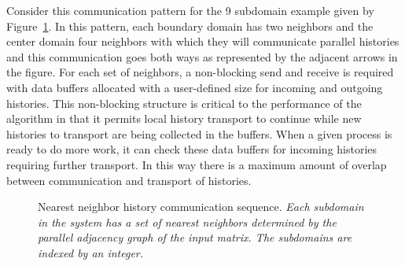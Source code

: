 \documentclass{snamc2013}
\begin{document}
Consider this communication pattern for the 9 subdomain example given
by Figure~\ref{fig:nearest_neighbor_comm}. In this pattern, each
boundary domain has two neighbors and the center domain four neighbors
with which they will communicate parallel histories and this
communication goes both ways as represented by the adjacent arrows in
the figure. For each set of neighbors, a non-blocking send and receive
is required with data buffers allocated with a user-defined size for
incoming and outgoing histories. This non-blocking structure is
critical to the performance of the algorithm in that it permits local
history transport to continue while new histories to transport are
being collected in the buffers. When a given process is ready to do
more work, it can check these data buffers for incoming histories
requiring further transport. In this way there is a maximum amount of
overlap between communication and transport of histories.

\begin{figure}[h!]
  \begin{center}
    \scalebox{0.7}{  }
  \end{center}
  \caption{Nearest neighbor history communication sequence.
    \textit{Each subdomain in the system has a set of nearest
      neighbors determined by the parallel adjacency graph of the
      input matrix. The subdomains are indexed by an integer.}}
  \label{fig:nearest_neighbor_comm}
\end{figure}
\end{document}
